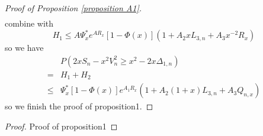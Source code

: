 \documentclass[bj,authoryear]{imsart}
\numberwithin{equation}{section}
\theoremstyle{plain}
\newtheorem{lem}{Lemma}[section]
\theoremstyle{definition}
\begin{document}
\begin{proof}[Proof of Proposition \ref{proposition A1}]
\begin{equation}
\begin{aligned}
  \end{aligned}
\end{equation}
combine with $$H_1\leq A\Psi_{x}^{*}e^{AR_x}[1-\Phi(x)](1+A_2xL_{3,n}+A_3x^{-2}R_x)$$
so we have
\begin{equation}
  \begin{aligned}
    &P(2xS_n-x^2V_n^2\geq x^2-2x\Delta_{1,n})\\
    =& H_1+H_2\\
    \leq & \Psi_{x}^{*}[1-\Phi(x)]e^{A_1R_x}(1+A_2(1+x)L_{3,n}+A_3Q_{n,x})
  \end{aligned}
\end{equation}
so we finish the proof of proposition1.




\end{proof}




\begin{proof} Proof of proposition1
  
\end{proof}
\end{document}
